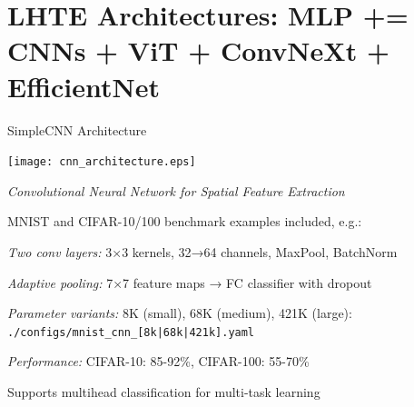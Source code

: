 
\section[toc={New Architectures}]{LHTE Architectures: MLP += \\
  CNNs + ViT + ConvNeXt + EfficientNet}

\begin{slidewhite}[\slideopts,toc={CNN}]{SimpleCNN Architecture}
  
  \centerline{\texttt{[image: cnn\_architecture.eps]}}

  \emph{Convolutional Neural Network for Spatial Feature Extraction}
  
  \begin{itemize}
    \mpitem MNIST and CIFAR-10/100 benchmark examples included, e.g.:

    \mpitem \emph{Two conv layers:} 3×3 kernels, 32→64 channels, MaxPool, BatchNorm
    
    \mpitem \emph{Adaptive pooling:} 7×7 feature maps → FC classifier with dropout
    
    \mpitem \emph{Parameter variants:} 8K (small), 68K (medium), 421K (large):\\
    \texttt{./configs/mnist\_cnn\_[8k|68k|421k].yaml}
    
    \mpitem \emph{Performance:} CIFAR-10: 85-92\%, CIFAR-100: 55-70\%
    
    \mpitem Supports multihead classification for multi-task learning
  \end{itemize}
  
\end{slidewhite}

